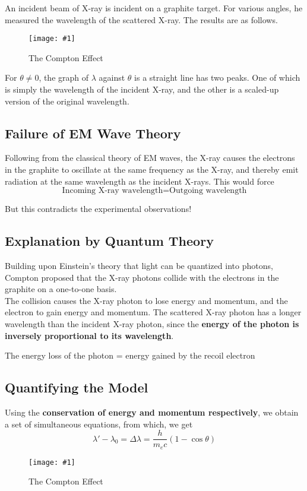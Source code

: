 \documentclass[a4paper,12pt]{article}
\newcommand{\lb}{\\[8pt]}
\newcommand{\img}[4]{\begin{center}
  \begin{figure}[H]
    \centering
    \texttt{[image: \#1]}
    \caption{#3}
    \label{fig:#4}
  \end{figure}
\end{center}}
\begin{document}
An incident beam of X-ray is incident on a graphite target. For various angles, he measured the wavelength of the scattered X-ray. The results are as follows.

\img{compton.png}{1}{The Compton Effect}{compton}

For $\theta \not = 0$, the graph of $\lambda$ against $\theta$ is a straight line has two peaks. One of which is simply the wavelength of the incident X-ray, and the other is a scaled-up version of the original wavelength.

\pagebreak

\subsection{Failure of EM Wave Theory}

Following from the classical theory of EM waves, the X-ray causes the electrons in the graphite to oscillate at the same frequency as the X-ray, and thereby emit radiation at the same wavelength as the incident X-rays. This would force $$\text{Incoming X-ray wavelength} = \text{Outgoing wavelength}$$

But this contradicts the experimental observations!

\subsection{Explanation by Quantum Theory}

Building upon Einstein's theory that light can be quantized into photons, Compton proposed that the X-ray photons collide with the electrons in the graphite on a one-to-one basis. \lb
The collision causes the X-ray photon to lose energy and momentum, and the electron to gain energy and momentum. The scattered X-ray photon has a longer wavelength than the incident X-ray photon, since the \textbf{energy of the photon is inversely proportional to its wavelength}.\lb
\begin{center}
  The energy loss of the photon = energy gained by the recoil electron
\end{center}


\subsection{Quantifying the Model}

Using the \textbf{conservation of energy and momentum respectively}, we obtain a set of simultaneous equations, from which, we get \begin{equation}\label{eq:compton_wavelength_change}
  \lambda' - \lambda_0  = \Delta \lambda = \frac{h}{m_ec}(1-\cos \theta)
\end{equation}
\img{compton2.png}{1}{The Compton Effect}{compton2}
\end{document}
